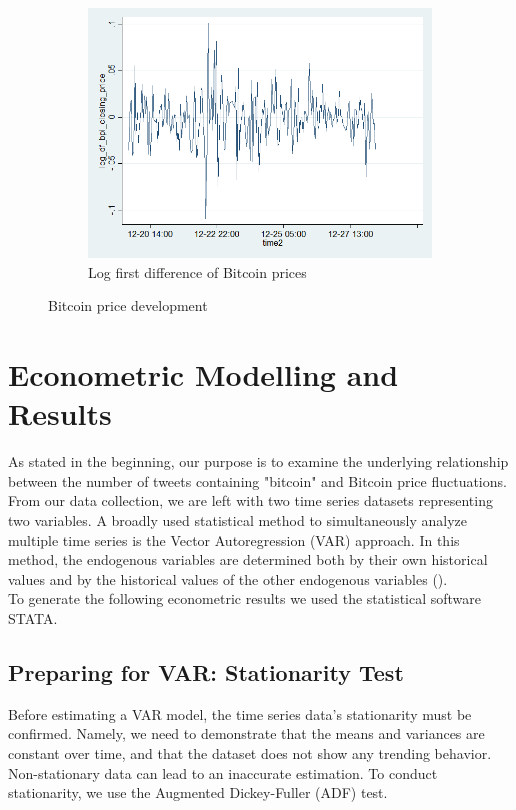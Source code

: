 \documentclass[a4paper,american,12pt]{article}
\begin{document}
\begin{spacing}{1.2}
\begin{figure}[H]
\begin{subfigure}{.3\textwidth}
	\includegraphics[width=1.12\textwidth]{stata_export_graphs/graph_plot_log_df_bpi.png}
	\caption{Log first difference of Bitcoin prices}
	\end{subfigure}
\caption{Bitcoin price development}
\end{figure}
	
\clearpage

\section{Econometric Modelling and Results}
\label{sec:EconometricModellingandResults}
As stated in the beginning, our purpose is to examine the underlying relationship between the number of tweets containing "bitcoin" and Bitcoin price fluctuations. From our data collection, we are left with two time series datasets representing two variables. A broadly used statistical method to simultaneously analyze multiple time series is the Vector Autoregression (VAR) approach. In this method, the endogenous variables are determined both by their own historical values and by the historical values of the other endogenous variables (\cite[pp.~4--5]{luetkepohl2007new}).\\
To generate the following econometric results we used the statistical software STATA.

\subsection{Preparing for VAR: Stationarity Test}
Before estimating a VAR model, the time series data's stationarity must be confirmed. Namely, we need to demonstrate that the means and variances are constant over time, and that the dataset does not show any trending behavior. Non-stationary data can lead to an inaccurate estimation. To conduct stationarity, we use the Augmented Dickey-Fuller (ADF) test.\\


\end{spacing}
\end{document}
